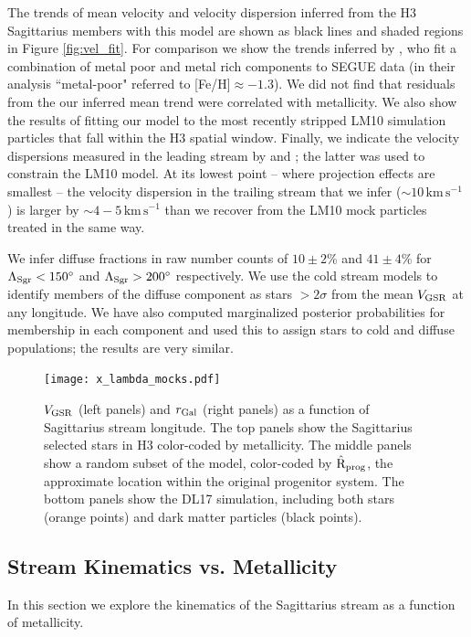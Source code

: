 \documentclass[twocolumn,tighten,twocolappendix]{aastex63}
\newcommand{\sgr}{Sagittarius}
\newcommand{\kms}{\mathrm{km} \, \mathrm{s}^{-1}}
\newcommand{\Vgsr}{V_{\rm GSR}}
\begin{document}
\begin{CJK*}{UTF8}{gbsn}
The trends of mean velocity and velocity dispersion inferred from the H3 \sgr{} members with this model are shown as black lines and shaded regions in Figure \ref{fig:vel_fit}.  For comparison we show the trends inferred by \citet{Gibbons17}, who fit a combination of metal poor and metal rich components to SEGUE data (in their analysis ``metal-poor" referred to [Fe/H]$\approx-1.3$).  We did not find that residuals from the our inferred mean trend were correlated with metallicity. We also show the results of fitting our model to the most recently stripped LM10 simulation particles that fall within the H3 spatial window.  Finally, we indicate the velocity dispersions measured in the leading stream by \citet{Majewski04} and \citet{Monaco07}; the latter was used to constrain the LM10 model.  At its lowest point -- where projection effects are smallest -- the velocity dispersion in the trailing stream that we infer ($\sim 10 \,\kms$) is larger by $\sim 4-5\,\kms$ than we recover from the LM10 mock particles treated in the same way.

We infer diffuse fractions in raw number counts of $10\pm2$\% and $41\pm4$\% for $\Lambda_{\rm Sgr} < 150^\circ$ and $\Lambda_{\rm Sgr} > 200^\circ$ respectively. We use the cold stream models to identify members of the diffuse component as stars $>2\sigma$ from the mean $\Vgsr$ at any longitude. We have also computed marginalized posterior probabilities for membership in each component and used this to assign stars to cold and diffuse populations; the results are very similar.

\begin{figure}
\texttt{[image: x\_lambda\_mocks.pdf]}
\caption{
  $\Vgsr$ (left panels) and $r_{\rm Gal}$ (right panels) as a function of \sgr{} stream longitude.
  The top panels show the \sgr{} selected stars in H3 color-coded by metallicity.  The middle panels show a random subset of the \citet{LM10} model, color-coded by $\hat{\rm R}_{\rm prog}$, the approximate location within the original progenitor system. The bottom panels show the DL17 simulation, including both stars (orange points) and dark matter particles (black points).
\label{fig:full_mocks}}
\end{figure}


\subsection{Stream Kinematics vs. Metallicity}

In this section we explore the kinematics of the \sgr{} stream as a function of metallicity.


\end{CJK*}
\end{document}
